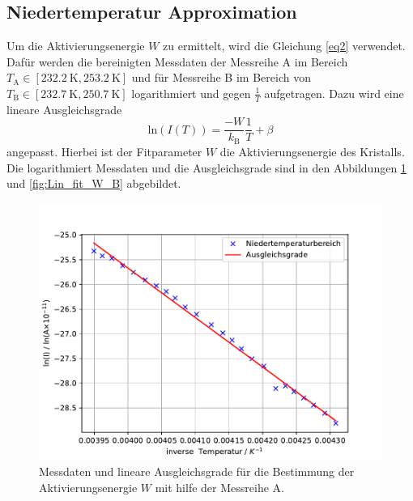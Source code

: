 \subsection{Niedertemperatur Approximation}
Um die Aktivierungsenergie $W$ zu ermittelt, wird die Gleichung \eqref{eq2} verwendet.
Dafür werden die bereinigten Messdaten der Messreihe A im Bereich $T_{\text{A}}\in \left[\SI{232.2}{\kelvin},\SI{253.2}{\kelvin}\right]$
und für Messreihe B im Bereich von $T_{\text{B}}\in \left[\SI{232.7}{\kelvin},\SI{250.7}{\kelvin}\right]$ logarithmiert und gegen $\frac{1}{T}$ aufgetragen.
Dazu wird eine lineare Ausgleichsgrade 
\begin{equation*}
    \text{ln}\left(I(T)\right) = \frac{-W}{k_{\text{{B}}}} \frac{1}{T} +\beta
\end{equation*}
angepasst. Hierbei ist der Fitparameter $W$ die Aktivierungsenergie des Kristalls.
Die logarithmiert Messdaten und die Ausgleichsgrade sind in den Abbildungen \ref{fig:Lin_fit_W_A} und \ref{fig:Lin_fit_W_B}
abgebildet.
\FloatBarrier
\begin{figure}
    \centering
    \includegraphics[width=\textwidth,keepaspectratio]{figure/LinFit_W_A.pdf}
    \caption{Messdaten und lineare Ausgleichsgrade für die Bestimmung der Aktivierungsenergie $W$ mit hilfe der Messreihe A.}
    \label{fig:Lin_fit_W_A}
\end{figure}
